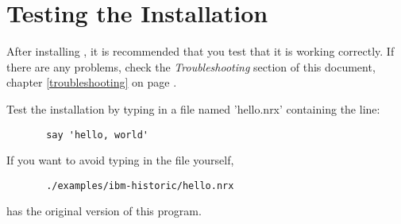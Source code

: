 \section{Testing the \nr{} Installation}\label{testing}
After installing \nr{}, it is recommended that you test that it is
working correctly. If there are any problems, check the
\emph{Troubleshooting} section of this document, chapter
\ref{troubleshooting} on page \pageref{troubleshooting}.

Test the installation by typing in a file named 'hello.nrx' containing the line:
\begin{verbatim} 
       say 'hello, world' 
\end{verbatim}
 If you want to avoid typing in the file yourself,
\begin{verbatim} 
       ./examples/ibm-historic/hello.nrx
\end{verbatim}
has the original version of this program.

